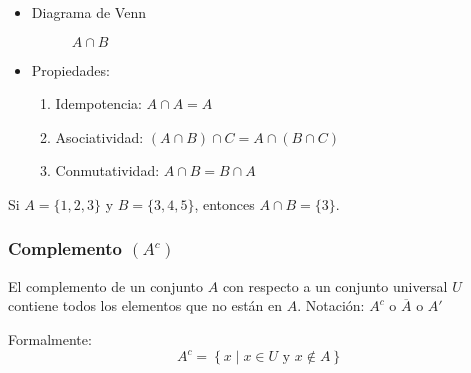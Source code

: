 \begin{itemize}
	\item Diagrama de Venn
	\begin{figure}[H]
		\centering
		\begin{venndiagram2sets}
			\fillACapB
		\end{venndiagram2sets}
		\caption*{\(A \cap B \)}
	\end{figure}
	
	\item Propiedades:
	\begin{enumerate}[label=\roman*)]
		\item Idempotencia: \( A \cap A = A \) 
		\item Asociatividad: \( \left( A \cap B \right) \cap C = A \cap \left( B \cap C \right) \) 
		\item Conmutatividad: \( A \cap B = B \cap A\) 
	\end{enumerate}
\end{itemize}

\begin{example}[Intersección]
	Si \(A = \{1, 2, 3\}\) y \(B = \{3, 4, 5\}\), entonces \(A \cap B = \{3\}\).
\end{example}

\subsubsection{Complemento $(A^c)$}
\vspace{1em} 

\begin{fmd-definition}[Complemento]
	El \gls{complemento} de un conjunto \(A\) con respecto a un conjunto universal \(U\) contiene todos los elementos que no están en \(A\).
	Notación: \(A^c\) o \(\overline{A}\) o \(A'\)
	
	Formalmente:
	\[ A^c = \left\{ x \mid x \in U \mbox{ y } x \not \in A \right\} \]
\end{fmd-definition}

